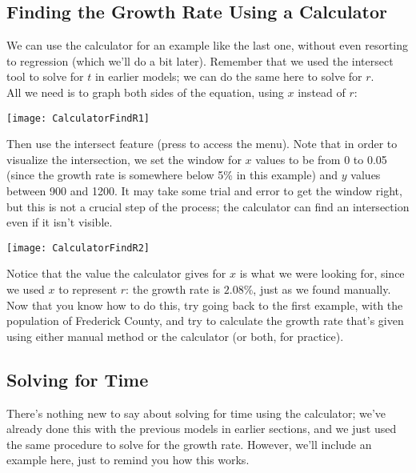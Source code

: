 \subsection{Finding the Growth Rate Using a Calculator}
We can use the calculator for an example like the last one, without even resorting to regression (which we'll do a bit later).  Remember that we used the intersect tool to solve for $t$ in earlier models; we can do the same here to solve for $r$.\\

All we need is to graph both sides of the equation, using $x$ instead of $r$:
\begin{center}
\texttt{[image: CalculatorFindR1]}
\end{center}

Then use the intersect feature (press   to access the menu).  Note that in order to visualize the intersection, we set the window for $x$ values to be from 0 to 0.05 (since the growth rate is somewhere below 5\% in this example) and $y$ values between 900 and 1200.  It may take some trial and error to get the window right, but this is not a crucial step of the process; the calculator can find an intersection even if it isn't visible.
\begin{center}
\texttt{[image: CalculatorFindR2]}
\end{center}

Notice that the value the calculator gives for $x$ is what we were looking for, since we used $x$ to represent $r$: the growth rate is $2.08\%$, just as we found manually.\\

Now that you know how to do this, try going back to the first example, with the population of Frederick County, and try to calculate the growth rate that's given using either manual method or the calculator (or both, for practice).
\pagebreak

\subsection{Solving for Time}
There's nothing new to say about solving for time using the calculator; we've already done this with the previous models in earlier sections, and we just used the same procedure to solve for the growth rate.  However, we'll include an example here, just to remind you how this works.

